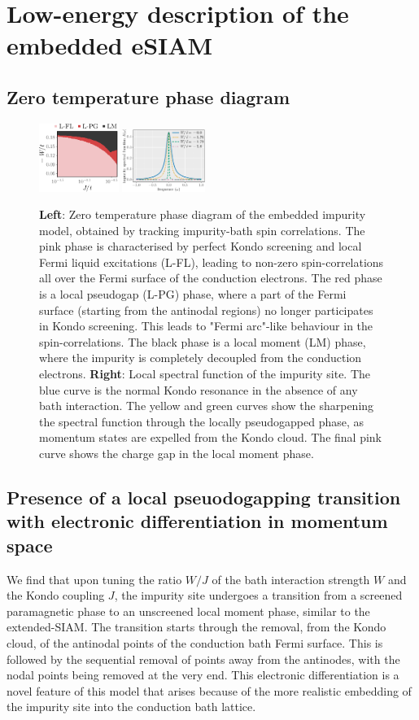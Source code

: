 \documentclass[reprint,hidelinks]{revtex4-2}
\begin{document}
\section{Low-energy description of the embedded eSIAM}
\subsection{Zero temperature phase diagram}
\begin{figure}[htpb]
	\centering
	\includegraphics[width=0.23\textwidth]{phaseDiagram.pdf}
	\includegraphics[width=0.24\textwidth]{impSpecFuncTrunc_49.pdf}
	\caption{{\bf Left}: Zero temperature phase diagram of the embedded impurity model, obtained by tracking impurity-bath spin correlations. The pink phase is characterised by perfect Kondo screening and local Fermi liquid excitations (L-FL), leading to non-zero spin-correlations all over the Fermi surface of the conduction electrons. The red phase is a local pseudogap (L-PG)  phase, where a part of the Fermi surface (starting from the antinodal regions) no longer participates in Kondo screening. This leads to "Fermi arc"-like behaviour in the spin-correlations. The black phase is a local moment (LM) phase, where the impurity is completely decoupled from the conduction electrons. {\bf Right}: Local spectral function of the impurity site. The blue curve is the normal Kondo resonance in the absence of any bath interaction. The yellow and green curves show the sharpening the spectral function through the locally pseudogapped phase, as momentum states are expelled from the Kondo cloud. The final pink curve shows the charge gap in the local moment phase.}
	\label{phaseDiagram}
\end{figure}

\subsection{Presence of a local pseuodogapping transition with electronic differentiation in momentum space}
We find that upon tuning the ratio \(W/J\) of the bath interaction strength \(W\) and the Kondo coupling  \(J\), the impurity site undergoes a transition from a screened paramagnetic phase to an unscreened local moment phase, similar to the extended-SIAM. The transition starts through the removal, from the Kondo cloud, of the antinodal points of the conduction bath Fermi surface. This is followed by the sequential removal of points away from the antinodes, with the nodal points being removed at the very end. This electronic differentiation is a novel feature of this model that arises because of the more realistic embedding of the impurity site into the conduction bath lattice.
\end{document}
